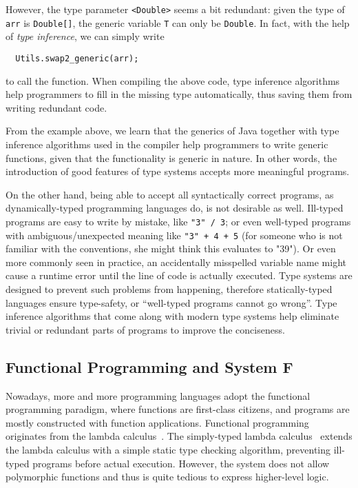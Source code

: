 However, the type parameter \verb|<Double>| seems a bit redundant:
given the type of \verb|arr| is \verb|Double[]|,
the generic variable \verb|T| can only be \verb|Double|.
In fact, with the help of \emph{type inference},
we can simply write
\begin{verbatim}
  Utils.swap2_generic(arr);
\end{verbatim}
to call the function.
When compiling the above code,
type inference algorithms help programmers to fill in the missing type automatically,
thus saving them from writing redundant code.

From the example above, we learn that the generics of Java
together with type inference algorithms used in the compiler
help programmers to write generic functions,
given that the functionality is generic in nature.
In other words, the introduction of good features of type systems
accepts more meaningful programs.

On the other hand, being able to accept all syntactically correct programs,
as dynamically-typed programming languages do,
is not desirable as well.
Ill-typed programs are easy to write by mistake, like \verb|"3" / 3|;
or even well-typed programs with ambiguous/unexpected meaning like \verb|"3" + 4 + 5|
(for someone who is not familiar with the conventions, she might think this evaluates to "39").
Or even more commonly seen in practice,
an accidentally misspelled variable name might cause a runtime error until
the line of code is actually executed.
Type systems are designed to prevent such problems from happening,
therefore statically-typed languages
ensure type-safety, or ``well-typed programs cannot go wrong''.
Type inference algorithms that come along with modern type systems
help eliminate trivial or redundant parts of programs to
improve the conciseness.

\subsection{Functional Programming and System F}
Nowadays, more and more programming languages adopt the functional programming paradigm,
where functions are first-class citizens,
and programs are mostly constructed with function applications.
Functional programming originates from the
lambda calculus~\citep{alonzo1932lambda}.
The simply-typed lambda calculus~\citep{pierce2002types} extends the lambda calculus with
a simple static type checking algorithm,
preventing ill-typed programs before actual execution.
However, the system does not allow polymorphic functions and
thus is quite tedious to express higher-level logic.

